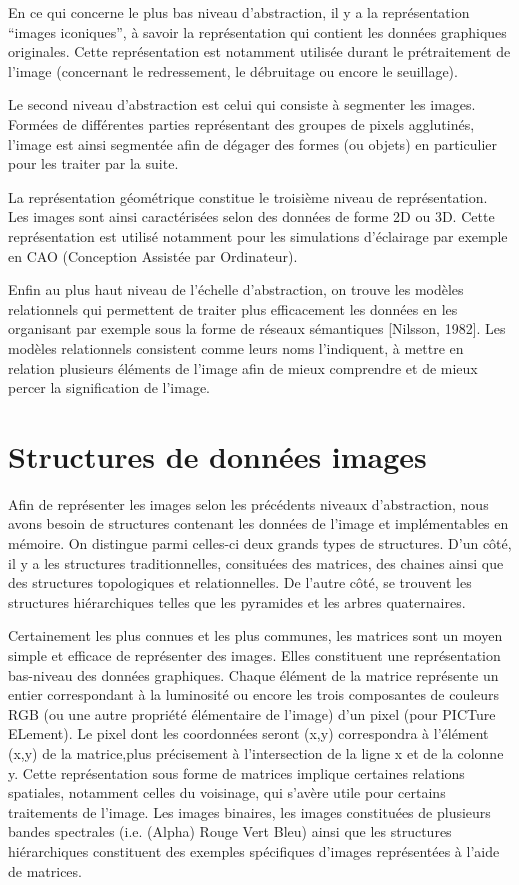 \documentclass[]{report}
\begin{document}
      En ce qui concerne le plus bas niveau d'abstraction, il y a la représentation ``images iconiques'', à savoir la représentation qui contient les données graphiques originales. Cette représentation est notamment utilisée durant le prétraitement de l'image (concernant le redressement, le débruitage ou encore le seuillage).

      Le second niveau d'abstraction est celui qui consiste à segmenter les images. Formées de différentes parties représentant des groupes de pixels agglutinés, l'image est ainsi segmentée afin de dégager des formes (ou objets) en particulier pour les traiter par la suite.

      La représentation géométrique constitue le troisième niveau de représentation. Les images sont ainsi caractérisées selon des données de forme 2D ou 3D. Cette représentation est utilisé notamment pour les simulations d'éclairage par exemple en CAO (Conception Assistée par Ordinateur).

      Enfin au plus haut niveau de l'échelle d'abstraction, on trouve les modèles relationnels qui permettent de traiter plus efficacement les données en les organisant par exemple sous la forme de réseaux sémantiques [Nilsson, 1982]. Les modèles relationnels consistent comme leurs noms l'indiquent, à mettre en relation plusieurs éléments de l'image afin de mieux comprendre et de mieux percer la signification de l'image.


    \section{Structures de donn\'ees images} %
    \label{sec:structures_de_donn'ees_images}
      Afin de représenter les images selon les précédents niveaux d'abstraction, nous avons besoin de structures contenant les données de l'image et implémentables en mémoire. On distingue parmi celles-ci deux grands types de structures. D'un côté, il y a les structures traditionnelles, consituées des matrices, des chaines ainsi que des structures topologiques et relationnelles. De l'autre côté, se trouvent les structures hiérarchiques telles que les pyramides et les arbres quaternaires.

      Certainement les plus connues et les plus communes, les matrices sont un moyen simple et efficace de représenter des images. Elles constituent une représentation bas-niveau des données graphiques. Chaque élément de la matrice représente un entier correspondant à la luminosité ou encore les trois composantes de couleurs RGB (ou une autre propriété élémentaire de l'image) d'un pixel (pour PICTure ELement). Le pixel dont les coordonnées seront (x,y) correspondra à l'élément (x,y) de la matrice,plus précisement à l'intersection de la ligne x et de la colonne y. Cette représentation sous forme de matrices implique certaines relations spatiales, notamment celles du voisinage, qui s'avère utile pour certains traitements de l'image. Les images binaires, les images constituées de plusieurs bandes spectrales (i.e. (Alpha) Rouge Vert Bleu) ainsi que les structures hiérarchiques constituent des exemples spécifiques d'images représentées à l'aide de matrices.
\end{document}

